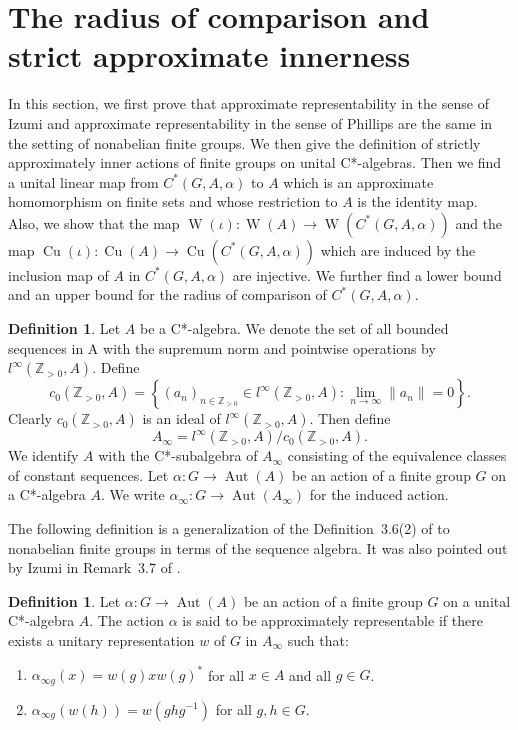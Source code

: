 \documentclass[10pt]{amsart}
\numberwithin{equation}{section}
\theoremstyle{definition}
\newtheorem{dfn}[thm]{Definition}
\newcommand{\af}{\alpha}
\newcommand{\N}{{\mathbb{Z}}_{> 0}}
\newcommand{\Cu}{{\operatorname{Cu}}}
\newcommand{\Aut}{{\operatorname{Aut}}}
\newcommand{\W}{{\operatorname{W}}}
\newcommand{\CGAa}{C^* (G, A, \af)}
\begin{document}
\section{The radius of comparison and strict approximate innerness}
\label{Sec_Approx_Innner}
In this section, we first prove that approximate representability in the sense of Izumi 
and approximate representability in the sense of Phillips are  the same in the setting of nonabelian finite groups. 
We then give the definition of strictly approximately inner actions 
of finite groups on  unital C*-algebras. 
Then we find a unital linear map  from $C^*(G, A, \alpha)$
to $A$ which is an approximate homomorphism on finite sets and whose restriction to $A$ is the identity map.
Also, we show that 
the map $\W (\iota) \colon \W (A) \to \W (\CGAa)$
and 
the map $\Cu (\iota) \colon \Cu (A) \to \Cu (\CGAa)$
which are induced by the inclusion map of $A$ in $C^*(G, A, \alpha)$ are injective.
We further find a lower bound and an upper bound for the radius of comparison of $C^*(G, A, \alpha)$.
\begin{dfn}
Let $A$ be a C*-algebra. We  denote the set of all bounded
sequences in A with the supremum norm and pointwise operations by $l^{\infty} (\N, A)$.
Define
\[
c_0 (\N, A)=\left\{ (a_n)_{n \in \N} \in  l^{\infty} (\N, A) \colon \lim_{n \to \infty} \| a_n \|=0  \right\}.
\]
Clearly $c_0 (\N, A)$ is an ideal of $l^{\infty} (\N, A)$. Then define
\[
A_{\infty} = l^{\infty} (\N, A)/ c_0 (\N, A).
\]
We identify $A$ with the C*-subalgebra of $A_{\infty}$ consisting of the equivalence classes of
constant sequences.
Let $\alpha \colon G \to \Aut (A)$ be an action of a finite group $G$ on a C*-algebra $A$.
 We write $\alpha_{\infty} \colon G \to \Aut (A_{\infty})$ for the induced action.
\end{dfn}
%
The following definition is a generalization of the Definition~3.6(2) of \cite{Iz1} 
to nonabelian finite groups  in terms of the  sequence algebra. 
It was also pointed out by Izumi in Remark~3.7 of \cite{Iz1}.
%
\begin{dfn} \label{Izum_Def_app_Rep}
Let $\alpha \colon G \to \Aut (A)$ be an action of a finite group $G$ on a unital C*-algebra $A$.
The action $\alpha$ is said to be approximately representable if 
there exists a unitary representation $w$ of $G$ in $A_{\infty}$ such that:
\begin{enumerate}
\item
$\alpha_{{\infty} g} (x) = w(g)x w(g)^*$ for all  $x \in A$ and all $g \in G$.
\item
$\alpha_{{\infty} g} (w(h)) = w(ghg^{-1})$ for all $g, h \in G$.
\end{enumerate}
\end{dfn}
\end{document}
